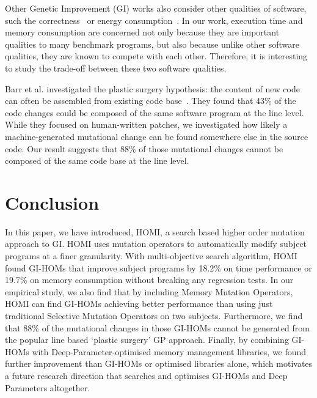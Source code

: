 \documentclass[oribibl]{llncs}
\begin{document}
{Other Genetic Improvement (GI) works also consider other qualities of software, such the correctness~\cite{6035728} or energy consumption~\cite{Bruce:2015:REC:2739480.2754752}.
In our work, execution time and memory consumption are concerned not only because they are important qualities to many benchmark programs, but also because unlike other software qualities, they are known to compete with each other.
Therefore, it is interesting to study the trade-off between these two software qualities.

Barr et al. investigated the plastic surgery hypothesis: the content of new code can often be assembled from existing code base~\cite{Barr:2014:PSH:2635868.2635898}.
They found that 43\% of the code changes could be composed of the same software program at the line level.
While they focused on human-written patches, we investigated how likely a machine-generated mutational change can be found somewhere else in the source code.
Our result suggests that 88\% of those mutational changes cannot be composed of the same code base at the line level.

\vspace{-3mm}
\section{Conclusion}
\label{sec_conclusion}
\vspace{-2mm}
In this paper, we have introduced, HOMI, a search based higher order mutation approach to GI. HOMI uses mutation operators to automatically modify subject programs at a finer granularity. With multi-objective search algorithm, HOMI found GI-HOMs that improve subject programs by 18.2\% on time performance or 19.7\% on memory consumption without breaking any regression tests. In our empirical study, we also find that by including Memory Mutation Operators, HOMI can find GI-HOMs achieving better performance than using just traditional Selective Mutation Operators on two subjects.
Furthermore, we find that 88\% of the mutational changes in those GI-HOMs cannot be generated from the popular line based `plastic surgery' GP approach. Finally, by combining GI-HOMs with Deep-Parameter-optimised memory management libraries, we found further improvement than GI-HOMs or optimised libraries alone, which motivates a future research direction that searches and optimises GI-HOMs and Deep Parameters altogether.

}
\end{document}
